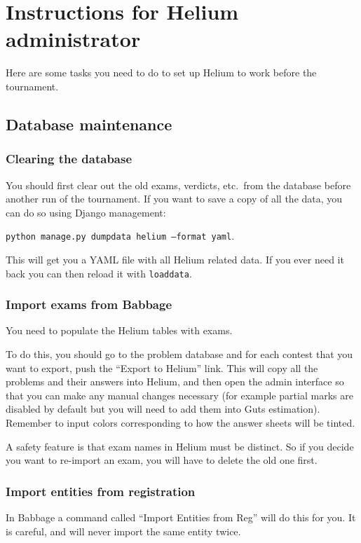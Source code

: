 \chapter{Instructions for Helium administrator}
Here are some tasks you need to do to set up Helium
to work before the tournament.

\section{Database maintenance}
\subsection{Clearing the database}
You should first clear out the old exams, verdicts, etc.\ from the database
before another run of the tournament.
If you want to save a copy of all the data,
you can do so using Django management:
\begin{center}
	\texttt{python manage.py dumpdata helium --format yaml}.
\end{center}
This will get you a YAML file with all Helium related data.
If you ever need it back you can then reload it with \texttt{loaddata}.

\subsection{Import exams from Babbage}
You need to populate the Helium tables with exams.

To do this, you should go to the problem database and for each contest
that you want to export, push the ``Export to Helium'' link.
This will copy all the problems and their answers into Helium,
and then open the admin interface
so that you can make any manual changes necessary
(for example partial marks are disabled by default
but you will need to add them into Guts estimation).
Remember to input colors corresponding to how the answer sheets will be tinted.

A safety feature is that exam names in Helium must be distinct.
So if you decide you want to re-import an exam,
you will have to delete the old one first.

\subsection{Import entities from registration}
In Babbage a command called ``Import Entities from Reg'' will do this for you.
It is careful, and will never import the same entity twice.


